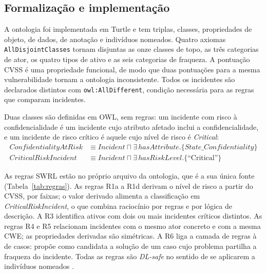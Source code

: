 \documentclass[12pt]{article}
\newcommand{\oc}[1]{\texttt{#1}}
\begin{document}
\subsection{Formalização e implementação}

A ontologia foi implementada em Turtle e tem \vSevenTriples{} triplas, \vSevenClasses{} classes, \vSevenObjProps{} propriedades de objeto, \vSevenDataProps{} de dados, \vSevenAnnProps{} de anotação e \vSevenIndividuals{} indivíduos nomeados. Quatro axiomas \oc{AllDisjointClasses} tornam disjuntas as onze classes de topo, as três categorias de ator, os quatro tipos de ativo e as seis categorias de fraqueza. A pontuação CVSS é uma propriedade funcional, de modo que duas pontuações para a mesma vulnerabilidade tornam a ontologia inconsistente. Todos os incidentes são declarados distintos com \oc{owl:AllDifferent}, condição necessária para as regras que comparam incidentes.

Duas classes são definidas em OWL, sem regras: um incidente com risco à confidencialidade é um incidente cujo atributo afetado inclui a confidencialidade, e um incidente de risco crítico é aquele cujo nível de risco é \emph{Critical}:
\begin{align*}
\mathit{ConfidentialityAtRisk} &\equiv \mathit{Incident} \sqcap \exists\,\mathit{hasAttribute}.\{\mathit{State\_Confidentiality}\}\\
\mathit{CriticalRiskIncident} &\equiv \mathit{Incident} \sqcap \exists\,\mathit{hasRiskLevel}.\{\text{``Critical''}\}
\end{align*}

As regras SWRL estão no próprio arquivo da ontologia, que é a sua única fonte (Tabela~\ref{tab:regras}). As regras R1a a R1d derivam o nível de risco a partir do CVSS, por faixas; o valor derivado alimenta a classificação em \emph{CriticalRiskIncident}, o que combina raciocínio por regras e por lógica de descrição. A R3 identifica ativos com dois ou mais incidentes críticos distintos. As regras R4 e R5 relacionam incidentes com o mesmo ator concreto e com a mesma CWE; as propriedades derivadas são simétricas. A R6 liga a camada de regras à de casos: propõe como candidata a solução de um caso cujo problema partilha a fraqueza do incidente. Todas as regras são \emph{DL-safe} no sentido de se aplicarem a indivíduos nomeados \cite{motik2005}.
\end{document}
